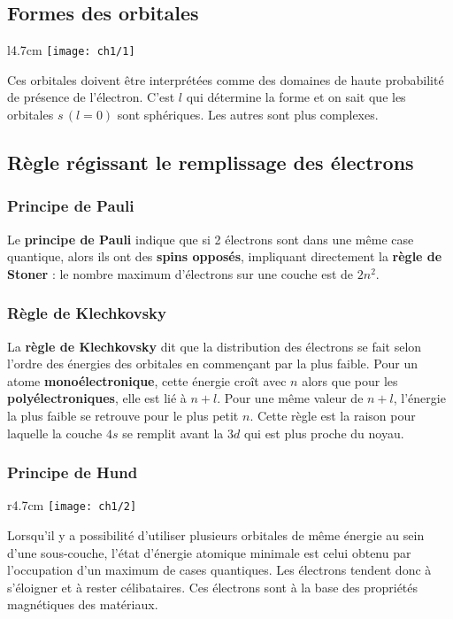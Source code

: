 \subsection{Formes des orbitales}
\begin{wrapfigure}[4]{l}{4.7cm}
	\vspace{-5mm}
	\texttt{[image: ch1/1]}
\end{wrapfigure}
Ces orbitales doivent être interprétées comme des domaines de haute probabilité de présence de l'électron. C'est $l$ qui détermine la forme et on sait que les orbitales $s\, (l=0)$ sont sphériques. Les autres sont plus complexes. \\
		
\subsection{Règle régissant le remplissage des électrons}
\subsubsection{Principe de Pauli}
Le \textbf{principe de Pauli} indique que si 2 électrons sont dans une même case quantique, alors ils ont des \textbf{spins opposés}, impliquant directement la \textbf{règle de Stoner} : le nombre maximum d'électrons sur une couche est de $2n^2$. 
	
\subsubsection{Règle de Klechkovsky}
La \textbf{règle de Klechkovsky} dit que la distribution des électrons se fait selon l'ordre des énergies des orbitales en commençant par la plus faible. Pour un atome \textbf{monoélectronique}, cette énergie croît avec $n$ alors que pour les \textbf{polyélectroniques}, elle est lié à $n+l$. Pour une même valeur de $n+l$, l'énergie la plus faible se retrouve pour le plus petit $n$. Cette règle est la raison pour laquelle la couche $4s$ se remplit avant la $3d$ qui est plus proche du noyau.\\
	
\subsubsection{Principe de Hund}
\begin{wrapfigure}[5]{r}{4.7cm}
	\vspace{-5mm}
	\texttt{[image: ch1/2]}
\end{wrapfigure}
Lorsqu'il y a possibilité d'utiliser plusieurs orbitales de même énergie au sein d'une sous-couche, l'état d'énergie atomique minimale est celui obtenu par l'occupation d'un maximum de cases quantiques. Les électrons tendent donc à s'éloigner et à rester célibataires. Ces électrons sont à la base des propriétés magnétiques des matériaux. 
	
